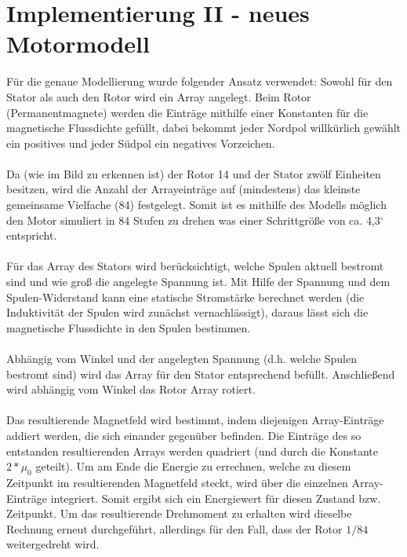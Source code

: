 \section{Implementierung II - neues Motormodell}
Für die genaue Modellierung wurde folgender Ansatz verwendet: Sowohl für den Stator als auch den Rotor wird ein Array angelegt. Beim Rotor (Permanentmagnete) werden die Einträge mithilfe einer Konstanten für die magnetische Flussdichte gefüllt, dabei bekommt jeder Nordpol willkürlich gewählt ein positives und jeder Südpol ein negatives Vorzeichen. 

\paragraph{}
Da (wie im Bild zu erkennen ist) der Rotor 14 und der Stator zwölf Einheiten besitzen, wird die Anzahl der Arrayeinträge auf (mindestens) das kleinste gemeinsame Vielfache (84) festgelegt. Somit ist es mithilfe des Modells möglich den Motor simuliert in 84 Stufen zu drehen was einer Schrittgröße von ca. 4,3$^{\circ}$ entspricht. 

\paragraph{}
Für das Array des Stators wird berücksichtigt, welche Spulen aktuell bestromt sind und wie groß die angelegte Spannung ist. Mit Hilfe der Spannung und dem Spulen-Widerstand kann eine statische Stromstärke berechnet werden (die Induktivität der Spulen wird zunächst vernachlässigt), daraus lässt sich die magnetische Flussdichte in den Spulen bestimmen. 

\paragraph{}
Abhängig vom Winkel und der angelegten Spannung (d.h. welche Spulen bestromt sind) wird das Array für den Stator entsprechend befüllt. 
Anschließend wird abhängig vom Winkel das Rotor Array rotiert. 

\paragraph{}
Das resultierende Magnetfeld wird bestimmt, indem diejenigen Array-Einträge addiert werden, die sich einander gegenüber befinden. 
Die Einträge des so entstanden resultierenden Arrays werden quadriert (und durch die Konstante $2*\mu_0$ geteilt). 
Um am Ende die Energie zu errechnen, welche zu diesem Zeitpunkt im resultierenden Magnetfeld steckt, wird über die einzelnen Array-Einträge integriert. 
Somit ergibt sich ein Energiewert für diesen Zustand bzw. Zeitpunkt. 
Um das resultierende Drehmoment zu erhalten wird dieselbe Rechnung erneut durchgeführt, allerdings für den Fall, dass der Rotor $1/84$ weitergedreht wird. 

